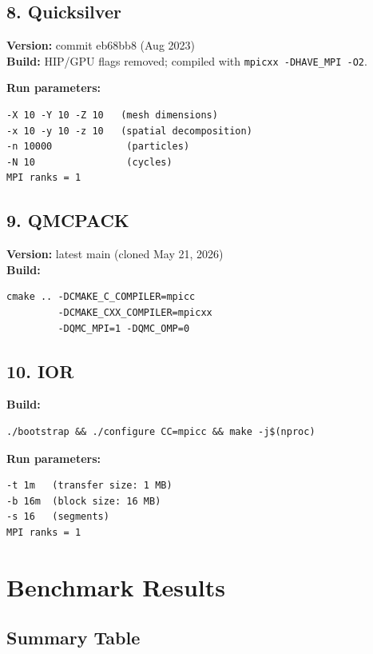 \documentclass[12pt,a4paper]{article}
\begin{document}
\subsection{8. Quicksilver}

\textbf{Version:} commit eb68bb8 (Aug 2023)\\
\textbf{Build:} HIP/GPU flags removed; compiled with \texttt{mpicxx -DHAVE\_MPI -O2}.

\textbf{Run parameters:}
\begin{verbatim}
-X 10 -Y 10 -Z 10   (mesh dimensions)
-x 10 -y 10 -z 10   (spatial decomposition)
-n 10000             (particles)
-N 10                (cycles)
MPI ranks = 1
\end{verbatim}

\subsection{9. QMCPACK}

\textbf{Version:} latest main (cloned May 21, 2026)\\
\textbf{Build:}
\begin{verbatim}
cmake .. -DCMAKE_C_COMPILER=mpicc
         -DCMAKE_CXX_COMPILER=mpicxx
         -DQMC_MPI=1 -DQMC_OMP=0
\end{verbatim}

\subsection{10. IOR}

\textbf{Build:}
\begin{verbatim}
./bootstrap && ./configure CC=mpicc && make -j$(nproc)
\end{verbatim}

\textbf{Run parameters:}
\begin{verbatim}
-t 1m   (transfer size: 1 MB)
-b 16m  (block size: 16 MB)
-s 16   (segments)
MPI ranks = 1
\end{verbatim}

\section{Benchmark Results}

\subsection{Summary Table}
\end{document}
